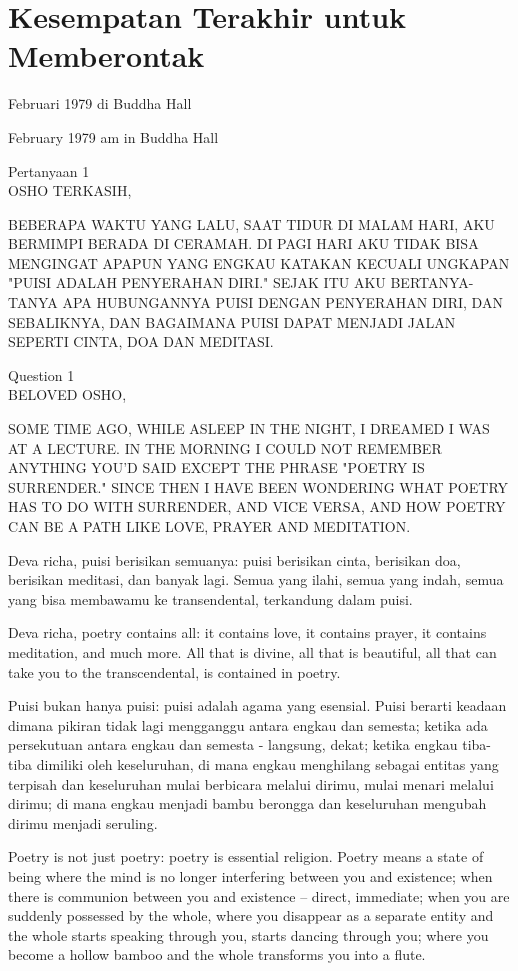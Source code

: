 \chapter{Kesempatan Terakhir untuk Memberontak} %

 Februari 1979 di Buddha Hall

 February 1979 am in Buddha Hall

\bahasa
Pertanyaan 1\\
OSHO TERKASIH,

BEBERAPA WAKTU YANG LALU, SAAT TIDUR DI MALAM HARI, AKU BERMIMPI BERADA DI CERAMAH. DI PAGI HARI AKU TIDAK BISA MENGINGAT APAPUN YANG ENGKAU KATAKAN KECUALI UNGKAPAN "PUISI ADALAH PENYERAHAN DIRI." SEJAK ITU AKU BERTANYA-TANYA APA HUBUNGANNYA PUISI DENGAN PENYERAHAN DIRI, DAN SEBALIKNYA, DAN BAGAIMANA PUISI DAPAT MENJADI JALAN SEPERTI CINTA, DOA DAN MEDITASI.

\english
Question 1\\
BELOVED OSHO,

SOME TIME AGO, WHILE ASLEEP IN THE NIGHT, I DREAMED I WAS AT A LECTURE. IN THE MORNING I COULD NOT REMEMBER ANYTHING YOU'D SAID EXCEPT THE PHRASE "POETRY IS SURRENDER." SINCE THEN I HAVE BEEN WONDERING WHAT POETRY HAS TO DO WITH SURRENDER, AND VICE VERSA, AND HOW POETRY CAN BE A PATH LIKE LOVE, PRAYER AND MEDITATION.

\bahasa
Deva richa, puisi berisikan semuanya: puisi berisikan cinta, berisikan doa, berisikan meditasi, dan banyak lagi. Semua yang ilahi, semua yang indah, semua yang bisa membawamu ke transendental, terkandung dalam puisi.

\english
Deva richa, poetry contains all: it contains love, it contains prayer, it contains meditation, and much more. All that is divine, all that is beautiful, all that can take you to the transcendental, is contained in poetry.

\bahasa
Puisi bukan hanya puisi: puisi adalah agama yang esensial. Puisi berarti keadaan dimana pikiran tidak lagi mengganggu antara engkau dan semesta; ketika ada persekutuan antara engkau dan semesta - langsung, dekat; ketika engkau tiba-tiba dimiliki oleh keseluruhan, di mana engkau menghilang sebagai entitas yang terpisah dan keseluruhan mulai berbicara melalui dirimu, mulai menari melalui dirimu; di mana engkau menjadi bambu berongga dan keseluruhan mengubah dirimu menjadi seruling.

\english
Poetry is not just poetry: poetry is essential religion. Poetry means a state of being where the mind is no longer interfering between you and existence; when there is communion between you and existence -- direct, immediate; when you are suddenly possessed by the whole, where you disappear as a separate entity and the whole starts speaking through you, starts dancing through you; where you become a hollow bamboo and the whole transforms you into a flute.

